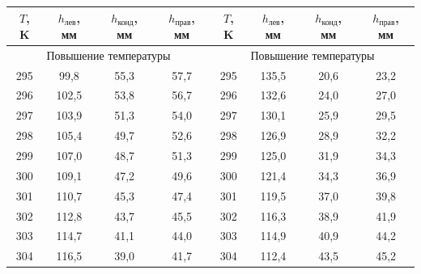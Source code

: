\documentclass[a4paper,12pt]{article} %
\begin{document}
\begin{enumerate}
		\begin{table}[h!]
			\centering
			\begin{tabular}{|c|c|c|c|c|c|c|c|}
				\hline
				$T$, K & $h_{\text{лев}}$, мм & $h_{\text{конд}}$, мм & $h_{\text{прав}}$, мм & $T$, K & $h_{\text{лев}}$, мм & $h_{\text{конд}}$, мм & $h_{\text{прав}}$, мм \\ \hline
				\multicolumn{4}{|c|}{Повышение температуры}                                  & \multicolumn{4}{c|}{Повышение температуры}                                   \\ \hline
				295    & 99,8                 & 55,3                 & 57,7                  & 295    & 135,5                & 20,6                 & 23,2                  \\ \hline
				296    & 102,5                & 53,8                 & 56,7                  & 296    & 132,6                & 24,0                 & 27,0                  \\ \hline
				297    & 103,9                & 51,3                 & 54,0                  & 297    & 130,1                & 25,9                 & 29,5                  \\ \hline
				298    & 105,4                & 49,7                 & 52,6                  & 298    & 126,9                & 28,9                 & 32,2                  \\ \hline
				299    & 107,0                & 48,7                 & 51,3                  & 299    & 125,0                & 31,9                 & 34,3                  \\ \hline
				300    & 109,1                & 47,2                 & 49,6                  & 300    & 121,4                & 34,3                 & 36,9                  \\ \hline
				301    & 110,7                & 45,3                 & 47,4                  & 301    & 119,5                & 37,0                 & 39,8                  \\ \hline
				302    & 112,8                & 43,7                 & 45,5                  & 302    & 116,3                & 38,9                 & 41,9                  \\ \hline
				303    & 114,7                & 41,1                 & 44,0                  & 303    & 114,9                & 40,9                 & 44,2                  \\ \hline
				304    & 116,5                & 39,0                 & 41,7                  & 304    & 112,4                & 43,5                 & 45,2                  \\ \hline

\end{tabular}
\end{table}
\end{enumerate}
\end{document}
